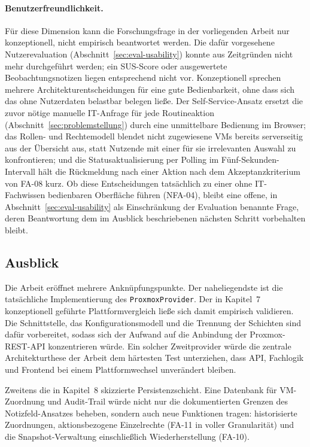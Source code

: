 \documentclass[12pt,a4paper]{article}
\begin{document}
\paragraph{Benutzerfreundlichkeit.} Für diese Dimension kann die Forschungsfrage in der vorliegenden Arbeit nur konzeptionell, nicht empirisch beantwortet werden. Die dafür vorgesehene Nutzerevaluation (Abschnitt~\ref{sec:eval-usability}) konnte aus Zeitgründen nicht mehr durchgeführt werden; ein SUS-Score oder ausgewertete Beobachtungsnotizen liegen entsprechend nicht vor. Konzeptionell sprechen mehrere Architekturentscheidungen für eine gute Bedienbarkeit, ohne dass sich das ohne Nutzerdaten belastbar belegen ließe. Der Self-Service-Ansatz ersetzt die zuvor nötige manuelle IT-Anfrage für jede Routineaktion (Abschnitt~\ref{sec:problemstellung}) durch eine unmittelbare Bedienung im Browser; das Rollen- und Rechtemodell blendet nicht zugewiesene VMs bereits serverseitig aus der Übersicht aus, statt Nutzende mit einer für sie irrelevanten Auswahl zu konfrontieren; und die Statusaktualisierung per Polling im Fünf-Sekunden-Intervall hält die Rückmeldung nach einer Aktion nach dem Akzeptanzkriterium von FA-08 kurz. Ob diese Entscheidungen tatsächlich zu einer ohne IT-Fachwissen bedienbaren Oberfläche führen (NFA-04), bleibt eine offene, in Abschnitt~\ref{sec:eval-usability} als Einschränkung der Evaluation benannte Frage, deren Beantwortung dem im Ausblick beschriebenen nächsten Schritt vorbehalten bleibt.

\subsection{Ausblick}

Die Arbeit eröffnet mehrere Anknüpfungspunkte. Der naheliegendste ist die tatsächliche Implementierung des \texttt{ProxmoxProvider}. Der in Kapitel~7 konzeptionell geführte Plattformvergleich ließe sich damit empirisch validieren. Die Schnittstelle, das Konfigurationsmodell und die Trennung der Schichten sind dafür vorbereitet, sodass sich der Aufwand auf die Anbindung der Proxmox-REST-API konzentrieren würde. Ein solcher Zweitprovider würde die zentrale Architekturthese der Arbeit dem härtesten Test unterziehen, dass API, Fachlogik und Frontend bei einem Plattformwechsel unverändert bleiben.

Zweitens die in Kapitel~8 skizzierte Persistenzschicht. Eine Datenbank für VM-Zuordnung und Audit-Trail würde nicht nur die dokumentierten Grenzen des Notizfeld-Ansatzes beheben, sondern auch neue Funktionen tragen: historisierte Zuordnungen, aktionsbezogene Einzelrechte (FA-11 in voller Granularität) und die Snapshot-Verwaltung einschließlich Wiederherstellung (FA-10).
\end{document}
